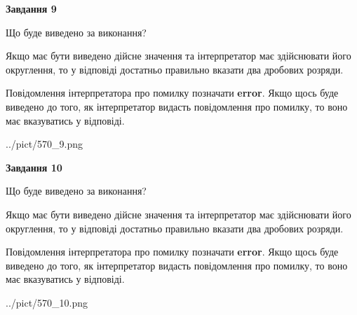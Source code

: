 \documentclass[12pt, ukrainian]{article}
\begin{document}
{\begin {Large}
{\begin {center}\textbf{Завдання 9}\end {center}}\par
Що буде виведено за виконання? \par

Якщо має бути виведено дійсне значення та інтерпретатор має здійснювати його округлення, 
то у відповіді достатньо правильно вказати два дробових розряди.

Повідомлення інтерпретатора про помилку позначати \textbf{error}.
Якщо щось буде виведено до того, як інтерпретатор видасть повідомлення про помилку, 
то воно має вказуватись у відповіді. \par

\begin{center}
	{../pict/570_9.png}
\end{center}
\newpage

{\begin {center}\textbf{Завдання 10}\end {center}}\par
Що буде виведено за виконання? \par

Якщо має бути виведено дійсне значення та інтерпретатор має здійснювати його округлення, 
то у відповіді достатньо правильно вказати два дробових розряди.

Повідомлення інтерпретатора про помилку позначати \textbf{error}.
Якщо щось буде виведено до того, як інтерпретатор видасть повідомлення про помилку, 
то воно має вказуватись у відповіді. \par

\begin{center}
	{../pict/570_10.png}
\end{center}
\newpage

\end {Large}}
\end{document}
